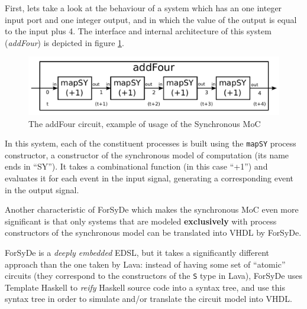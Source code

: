 \documentclass[a4paper]{article}
\begin{document}
                First, lets take a look at the behaviour of a system which has an one integer input
                port and one integer output, and in which the value of the output is equal to the
                input plus 4. The interface and internal architecture of this system
                (\emph{addFour}) is depicted in figure \ref{fig:forsyde-addFour}.

                \begin{figure}[h!]
                    \begin{center}
                        \includegraphics[width=1.0\textwidth]{imgs/forsyde-addFour.pdf}
                    \end{center}
                    \caption{The addFour circuit, example of usage of the Synchronous MoC
                        \label{fig:forsyde-addFour}}
                \end{figure}

                In this system, each of the constituent processes is built using the \texttt{mapSY}
                process constructor, a constructor of the synchronous model of computation (its name
                ends in ``SY''). It takes a combinational function (in this case ``+1'') and
                evaluates it for each event in the input signal, generating a corresponding event in
                the output signal.

                Another characteristic of ForSyDe which makes the synchronous MoC even more
                significant is that only systems that are modeled \textbf{exclusively} with process
                constructors of the synchronous model can be translated into VHDL by ForSyDe.

                ForSyDe is a \emph{deeply embedded} EDSL, but it takes a significantly different
                approach than the one taken by Lava: instead of having some set of ``atomic''
                circuits (they correspond to the constructors of the \texttt{S} type in Lava),
                ForSyDe uses Template Haskell to \emph{reify} Haskell source code into a syntax
                tree, and use this syntax tree in order to simulate and/or translate the circuit
                model into VHDL.
\end{document}
